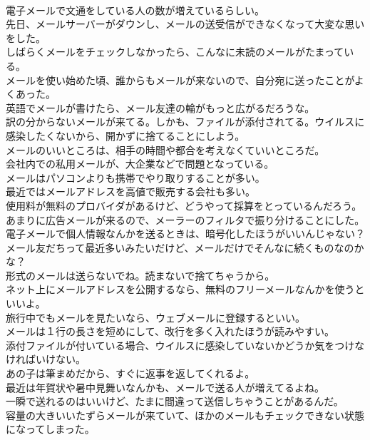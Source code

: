 \documentclass[8pt]{extreport}
\begin{document}
\begin{CJK}{UTF8}{min}
\\	電子メールで文通をしている人の数が増えているらしい。	
\\	先日、メールサーバーがダウンし、メールの送受信ができなくなって大変な思いをした。	
\\	しばらくメールをチェックしなかったら、こんなに未読のメールがたまっている。	
\\	メールを使い始めた頃、誰からもメールが来ないので、自分宛に送ったことがよくあった。	
\\	英語でメールが書けたら、メール友達の輪がもっと広がるだろうな。	
\\	訳の分からないメールが来てる。しかも、ファイルが添付されてる。ウイルスに感染したくないから、開かずに捨てることにしよう。	
\\	メールのいいところは、相手の時間や都合を考えなくていいところだ。	
\\	会社内での私用メールが、大企業などで問題となっている。	
\\	メールはパソコンよりも携帯でやり取りすることが多い。	
\\	最近ではメールアドレスを高値で販売する会社も多い。	
\\	使用料が無料のプロバイダがあるけど、どうやって採算をとっているんだろう。	
\\	あまりに広告メールが来るので、メーラーのフィルタで振り分けることにした。	
\\	電子メールで個人情報なんかを送るときは、暗号化したほうがいいんじゃない？	
\\	メール友だちって最近多いみたいだけど、メールだけでそんなに続くものなのかな？	
\\	形式のメールは送らないでね。読まないで捨てちゃうから。	
\\	ネット上にメールアドレスを公開するなら、無料のフリーメールなんかを使うといいよ。	
\\	旅行中でもメールを見たいなら、ウェブメールに登録するといい。	
\\	メールは１行の長さを短めにして、改行を多く入れたほうが読みやすい。	
\\	添付ファイルが付いている場合、ウイルスに感染していないかどうか気をつけなければいけない。	
\\	あの子は筆まめだから、すぐに返事を返してくれるよ。	
\\	最近は年賀状や暑中見舞いなんかも、メールで送る人が増えてるよね。	
\\	一瞬で送れるのはいいけど、たまに間違って送信しちゃうことがあるんだ。	
\\	容量の大きいいたずらメールが来ていて、ほかのメールもチェックできない状態になってしまった。	

\end{CJK}
\end{document}
